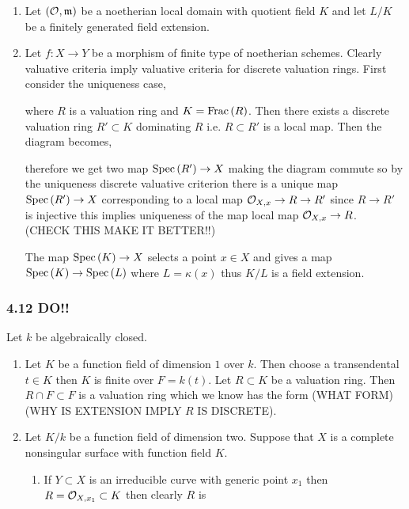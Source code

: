 \documentclass[12pt]{article}
\begin{document}
\begin{enumerate}
\item Let $(\mathcal{O}_{}, \mathfrak{m})$ be a noetherian local domain with quotient field $K$ and let $L / K$ be a finitely generated field extension. 

\item Let $f : X \to Y$ be a morphism of finite type of noetherian schemes. Clearly valuative criteria imply valuative criteria for discrete valuation rings. First consider the uniqueness case,
\begin{center}
\end{center}
where $R$ is a valuation ring and $K = \mathrm{Frac}\left(R\right)$.
Then there exists a discrete valuation ring $R' \subset K$ dominating $R$ i.e. $R \subset R'$ is a local map. Then the diagram becomes,
\begin{center}
\end{center}
therefore we get two map $\mathrm{Spec}\left( R' \right) \to X$ making the diagram commute so by the uniqueness discrete valuative criterion there is a unique map $\mathrm{Spec}\left( R' \right) \to X$ corresponding to a local map $\mathcal{O}_{X, x} \to R \to R'$ since $R \to R'$ is injective this implies uniqueness of the map local map $\mathcal{O}_{X, x} \to R$. (CHECK THIS MAKE IT BETTER!!)

 The map $\mathrm{Spec}\left( K \right) \to X$ selects a point $x \in X$ and gives a map $\mathrm{Spec}\left( K \right) \to \mathrm{Spec}\left( L \right)$ where $L = \kappa(x)$ thus $K / L$ is a field extension.
\end{enumerate}

\subsubsection{4.12 DO!!}

Let $k$ be algebraically closed.

\begin{enumerate}
\item Let $K$ be a function field of dimension $1$ over $k$. Then choose a transendental $t \in K$ then $K$ is finite over $F = k(t)$. Let $R \subset K$ be a valuation ring. Then $R \cap F \subset F$ is a valuation ring which we know has the form (WHAT FORM) (WHY IS EXTENSION IMPLY $R$ IS DISCRETE).

\item Let $K/k$ be a function field of dimension two. Suppose that $X$ is a complete nonsingular surface with function field $K$.
\begin{enumerate}
\item If $Y \subset X$ is an irreducible curve with generic point $x_1$ then $R = \mathcal{O}_{X, x_1} \subset K$ then clearly $R$ is 
\end{enumerate}
\end{enumerate}
\end{document}
